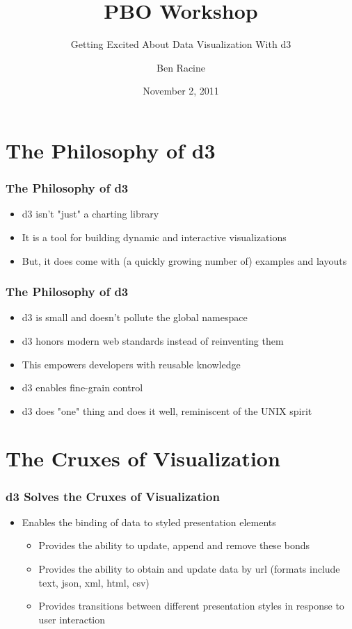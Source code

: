\documentclass{beamer}
\title{PBO Workshop}
\subtitle{Getting Excited About Data Visualization With d3}
\author{Ben Racine \inst{1} }
\institute{\inst{1} Cornerstone Systems NW }
\date{November 2, 2011}
\begin{document}
\begin{frame}
    \frametitle{}
    \titlepage
\end{frame}



\section{The Philosophy of d3}



\begin{frame}
\frametitle{The Philosophy of d3}
\begin{itemize}
\pause
\item d3 isn't "just" a charting library
\pause
\item It is a tool for building dynamic and interactive visualizations
\pause
\item But, it does come with (a quickly growing number of) examples and layouts
\end{itemize}
\end{frame}



\begin{frame}
\frametitle{The Philosophy of d3}
\begin{itemize}
\pause
\item d3 is small and doesn't pollute the global namespace
\pause
\item d3 honors modern web standards instead of reinventing them
\pause
\item This empowers developers with reusable knowledge
\pause
\item d3 enables fine-grain control
\pause
\item d3 does "one" thing and does it well, reminiscent of the UNIX spirit
\end{itemize}
\end{frame}




\section{The Cruxes of Visualization}


\begin{frame}
\frametitle{d3 Solves the Cruxes of Visualization}
\begin{itemize}
\pause
\item Enables the binding of data to styled presentation elements 
    \begin{itemize}
    \pause
    \item Provides the ability to update, append and remove these bonds 
    \pause
    \item Provides the ability to obtain and update data by url (formats include text, json, xml, html, csv)
    \pause
    \item Provides transitions between different presentation styles in response to user interaction
    \end{itemize}
\end{itemize}
\end{frame}
\end{document}
